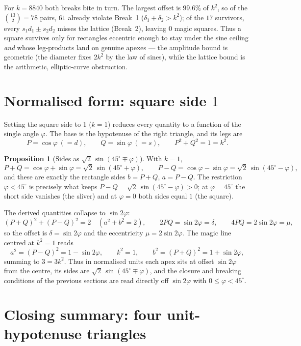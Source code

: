\documentclass[11pt]{article}
\theoremstyle{definition}
\newtheorem{proposition}{Proposition}
\begin{document}
\noindent For $k=8840$ both breaks bite in turn. The largest offset is
$99.6\%$ of $k^{2}$, so of the $\binom{13}{2}=78$ pairs, $61$ already violate
Break~1 ($\delta_1+\delta_2>k^{2}$); of the $17$ survivors, every
$s_1d_1\pm s_2d_2$ misses the lattice (Break~2), leaving $0$ magic squares.
Thus a square survives only for rectangles eccentric enough to stay under the
sine ceiling \emph{and} whose leg-products land on genuine apexes --- the amplitude
bound is geometric (the diameter fixes $2k^{2}$ by the law of sines), while the
lattice bound is the arithmetic, elliptic-curve obstruction.

\section{Normalised form: square side $1$}

Setting the square side to $1$ ($k=1$) reduces every quantity to a function of
the single angle $\varphi$. The base is the hypotenuse of the right triangle, and
its legs are
\[
  P=\cos\varphi\ (=d),\qquad Q=\sin\varphi\ (=s),\qquad P^{2}+Q^{2}=1=k^{2}.
\]

\begin{proposition}[Sides as $\sqrt2\,\sin(45^\circ\mp\varphi)$]\label{prop:normalised}
With $k=1$,
\[
  P+Q=\cos\varphi+\sin\varphi=\sqrt2\,\sin(45^\circ+\varphi),\qquad
  P-Q=\cos\varphi-\sin\varphi=\sqrt2\,\sin(45^\circ-\varphi),
\]
and these are exactly the rectangle sides $b=P+Q$, $a=P-Q$. The restriction
$\varphi<45^\circ$ is precisely what keeps $P-Q=\sqrt2\,\sin(45^\circ-\varphi)>0$;
at $\varphi=45^\circ$ the short side vanishes (the sliver) and at $\varphi=0$ both
sides equal $1$ (the square).
\end{proposition}

\noindent The derived quantities collapse to $\sin2\varphi$:
\[
  (P+Q)^{2}+(P-Q)^{2}=2\quad(a^{2}+b^{2}=2),\qquad
  2PQ=\sin2\varphi=\delta,\qquad
  4PQ=2\sin2\varphi=\mu,
\]
so the offset is $\delta=\sin2\varphi$ and the eccentricity $\mu=2\sin2\varphi$.
The magic line centred at $k^{2}=1$ reads
\[
  a^{2}=(P-Q)^{2}=1-\sin2\varphi,\qquad
  k^{2}=1,\qquad
  b^{2}=(P+Q)^{2}=1+\sin2\varphi,
\]
summing to $3=3k^{2}$. Thus in normalised units each apex sits at offset
$\sin2\varphi$ from the centre, its sides are $\sqrt2\,\sin(45^\circ\mp\varphi)$,
and the closure and breaking conditions of the previous sections are read directly
off $\sin2\varphi$ with $0\le\varphi<45^\circ$.

\section{Closing summary: four unit-hypotenuse triangles}
\end{document}

